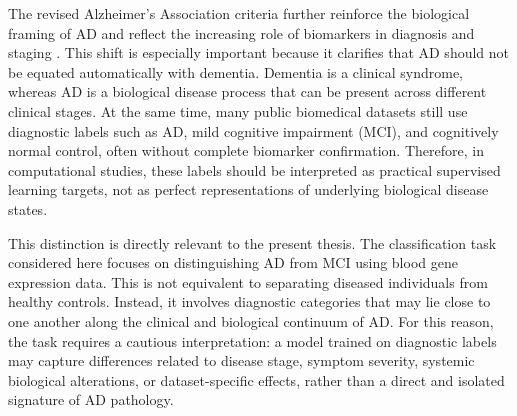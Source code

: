 The revised Alzheimer's Association criteria further reinforce the biological framing of AD and reflect the increasing role of biomarkers in diagnosis and staging \cite{jack2024revised}. This shift is especially important because it clarifies that AD should not be equated automatically with dementia. Dementia is a clinical syndrome, whereas AD is a biological disease process that can be present across different clinical stages. At the same time, many public biomedical datasets still use diagnostic labels such as AD, mild cognitive impairment (MCI), and cognitively normal control, often without complete biomarker confirmation. Therefore, in computational studies, these labels should be interpreted as practical supervised learning targets, not as perfect representations of underlying biological disease states.

This distinction is directly relevant to the present thesis. The classification task considered here focuses on distinguishing AD from MCI using blood gene expression data. This is not equivalent to separating diseased individuals from healthy controls. Instead, it involves diagnostic categories that may lie close to one another along the clinical and biological continuum of AD. For this reason, the task requires a cautious interpretation: a model trained on diagnostic labels may capture differences related to disease stage, symptom severity, systemic biological alterations, or dataset-specific effects, rather than a direct and isolated signature of AD pathology.




% 
% 
